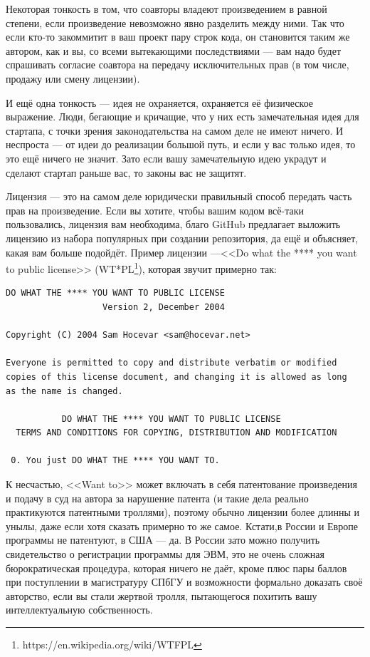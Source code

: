 \documentclass[a5paper]{article}
\begin{document}
Некоторая тонкость в том, что соавторы владеют произведением в равной степени, если произведение невозможно явно разделить между ними. Так что если кто-то закоммитит в ваш проект пару строк кода, он становится таким же автором, как и вы, со всеми вытекающими последствиями --- вам надо будет спрашивать согласие соавтора на передачу исключительных прав (в том числе, продажу или смену лицензии).

И ещё одна тонкость --- идея не охраняется, охраняется её физическое выражение. Люди, бегающие и кричащие, что у них есть замечательная идея для стартапа, с точки зрения законодательства на самом деле не имеют ничего. И неспроста --- от идеи до реализации большой путь, и если у вас только идея, то это ещё ничего не значит. Зато если вашу замечательную идею украдут и сделают стартап раньше вас, то законы вас не защитят.

Лицензия --- это на самом деле юридически правильный способ передать часть прав на произведение. Если вы хотите, чтобы вашим кодом всё-таки пользовались, лицензия вам необходима, благо GitHub предлагает выложить лицензию из набора популярных при создании репозитория, да ещё и объясняет, какая вам больше подойдёт. Пример лицензии ---<<Do what the **** you want to public license>> (WT*PL\footnote{https://en.wikipedia.org/wiki/WTFPL}), которая звучит примерно так:
\begin{verbatim}
DO WHAT THE **** YOU WANT TO PUBLIC LICENSE
                   Version 2, December 2004
 
Copyright (C) 2004 Sam Hocevar <sam@hocevar.net>

Everyone is permitted to copy and distribute verbatim or modified
copies of this license document, and changing it is allowed as long
as the name is changed.
 
           DO WHAT THE **** YOU WANT TO PUBLIC LICENSE
  TERMS AND CONDITIONS FOR COPYING, DISTRIBUTION AND MODIFICATION

 0. You just DO WHAT THE **** YOU WANT TO.
 \end{verbatim}

К несчастью, <<Want to>> может включать в себя патентование произведения и подачу в суд на автора за нарушение патента (и такие дела реально практикуются патентными троллями), поэтому обычно лицензии более длинны и унылы, даже если хотя сказать примерно то же самое. Кстати,в России и Европе программы не патентуют, в США --- да. В России зато можно получить свидетельство о регистрации программы для ЭВМ, это не очень сложная бюрократическая процедура, которая ничего не даёт, кроме плюс пары баллов при поступлении в магистратуру СПбГУ и возможности формально доказать своё авторство, если вы стали жертвой тролля, пытающегося похитить вашу интеллектуальную собственность.
\end{document}
